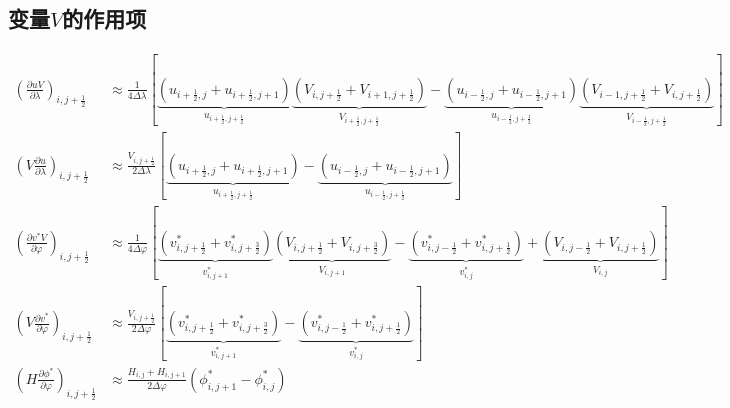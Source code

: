 \documentclass{ctexart}
\begin{document}
\subsection{变量$V$的作用项}
\begin{align}
  \left( \frac{\partial u V}{\partial \lambda} \right)_{i,j+\frac{1}{2}} & \approx \frac{1}{4 \Delta{\lambda}} \left[ \underbrace{\left( u_{i+\frac{1}{2},j} + u_{i+\frac{1}{2},j+1} \right)}_{u_{i+\frac{1}{2},j+\frac{1}{2}}} \underbrace{\left( V_{i,j+\frac{1}{2}} + V_{i+1,j+\frac{1}{2}} \right)}_{V_{i+\frac{1}{2},j+\frac{1}{2}}} - \underbrace{\left( u_{i-\frac{1}{2},j} + u_{i-\frac{1}{2},j+1} \right)}_{u_{i-\frac{1}{2},j+\frac{1}{2}}} \underbrace{\left( V_{i-1,j+\frac{1}{2}} + V_{i,j+\frac{1}{2}} \right)}_{V_{i-\frac{1}{2},j+\frac{1}{2}}} \right] \nonumber \\
  \left( V \frac{\partial u}{\partial \lambda} \right)_{i,j+\frac{1}{2}} & \approx \frac{V_{i,j+\frac{1}{2}}}{2 \Delta{\lambda}} \left[ \underbrace{\left( u_{i+\frac{1}{2},j} + u_{i+\frac{1}{2},j+1} \right)}_{u_{i+\frac{1}{2},j+\frac{1}{2}}} - \underbrace{\left( u_{i-\frac{1}{2},j} + u_{i-\frac{1}{2},j+1} \right)}_{u_{i-\frac{1}{2},j+\frac{1}{2}}} \right] \nonumber \\
  \left( \frac{\partial v^* V}{\partial \varphi} \right)_{i,j+\frac{1}{2}} & \approx \frac{1}{4 \Delta{\varphi}} \left[ \underbrace{\left( v_{i,j+\frac{1}{2}}^* + v_{i,j+\frac{3}{2}}^* \right)}_{v_{i,j+1}^*} \underbrace{\left( V_{i,j+\frac{1}{2}} + V_{i,j+\frac{3}{2}} \right)}_{V_{i,j+1}} - \underbrace{\left( v_{i,j-\frac{1}{2}}^* + v_{i,j+\frac{1}{2}}^* \right)}_{v_{i,j}^*} + \underbrace{\left( V_{i,j-\frac{1}{2}} + V_{i,j+\frac{1}{2}} \right)}_{V_{i,j}} \right] \nonumber \\
  \left( V \frac{\partial v^*}{\partial \varphi} \right)_{i,j+\frac{1}{2}} & \approx \frac{V_{i,j+\frac{1}{2}}}{2 \Delta{\varphi}} \left[ \underbrace{\left( v_{i,j+\frac{1}{2}}^* + v_{i,j+\frac{3}{2}}^* \right)}_{v_{i,j+1}^*} - \underbrace{\left( v_{i,j-\frac{1}{2}}^* + v_{i,j+\frac{1}{2}}^* \right)}_{v_{i,j}^*} \right] \nonumber \\
  \left( H \frac{\partial \phi^*}{\partial \varphi} \right)_{i,j+\frac{1}{2}} & \approx \frac{H_{i,j} + H_{i,j+1}}{2 \Delta{\varphi}} \left( \phi_{i,j+1}^* - \phi_{i,j}^* \right)
\end{align}
\end{document}
